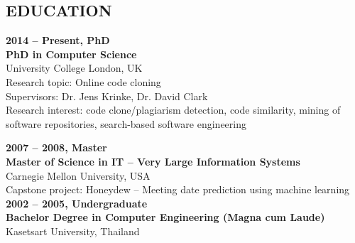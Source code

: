 \documentclass[margin, 10pt]{res} %
\begin{document}
\begin{resume}
\newpage


\section{EDUCATION}
\textbf{2014 -- Present, PhD}\\
\textbf{PhD in Computer Science}\\
University College London, UK\\
Research topic:  Online code cloning \\
Supervisors: Dr. Jens Krinke, Dr. David Clark\\
Research interest: code clone/plagiarism detection, code similarity, mining of software repositories, search-based software engineering 

\textbf{2007 -- 2008, Master} \\
\textbf{Master of Science in IT -- Very Large Information Systems}\\
Carnegie Mellon University, USA\\
Capstone project: Honeydew -- Meeting date prediction using machine learning \vspace{3mm} \\
\textbf{2002 -- 2005, Undergraduate }\\
\textbf{Bachelor Degree in Computer Engineering (Magna cum Laude)}\\
Kasetsart University, Thailand



\end{resume}
\end{document}
